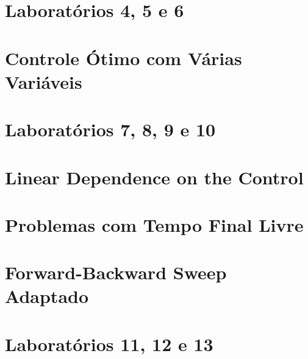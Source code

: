 \documentclass[a4paper, 11pt, oneside]{book}
\theoremstyle{definition}
\begin{document}
\chapter{Laboratórios 4, 5 e 6}
\label{labs456}


\chapter{Controle Ótimo com Várias Variáveis}
\label{ch:12}


\chapter{Laboratórios 7, 8, 9 e 10}
\label{labs78910}


\chapter{Linear Dependence on the Control}
\label{ch:17}


\chapter{Problemas com Tempo Final Livre}
\label{ch:20}


\chapter{Forward-Backward Sweep Adaptado}
\label{ch:21}


\chapter{Laboratórios 11, 12 e 13}
\label{labs111213}



\end{document}
